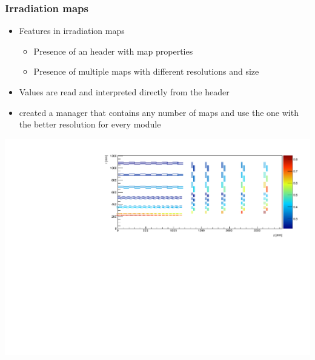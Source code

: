 \documentclass[pdftex, 11pt]{beamer}
\begin{document}
\begin{frame}
  \frametitle{Irradiation maps}
  \begin{itemize}
  \item \alert{Features} in irradiation maps
    \pause
    \begin{itemize}
    \item Presence of an \alert{header} with map properties
      \pause
    \item Presence of \alert{multiple maps} with different resolutions
      and size
    \end{itemize}
    \pause
  \item Values are \alert{read} and interpreted directly from the header
    \pause
  \item created a \alert{manager} that \alert{contains} any number of maps and use the one
    with the better resolution for every module
  \end{itemize}
   {
    \includegraphics[width=\textwidth-0.5cm]{img/irradiation.pdf}
  }
\end{frame}
\end{document}
